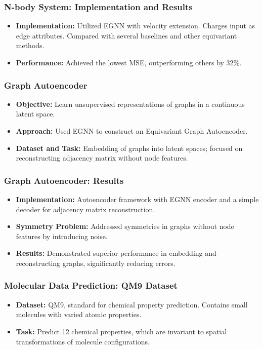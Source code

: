 \documentclass[11pt,xcolor={dvipsnames},hyperref={pdftex,pdfpagemode=UseNone,hidelinks,pdfdisplaydoctitle=true},usepdftitle=false]{beamer}
\begin{document}
\begin{frame}
\frametitle{N-body System: Implementation and Results}
\begin{itemize}
    \item \textbf{Implementation:} Utilized EGNN with velocity extension. Charges input as edge attributes. Compared with several baselines and other equivariant methods.
    \item \textbf{Performance:} Achieved the lowest MSE, outperforming others by 32\%.
\end{itemize}
\end{frame}


\begin{frame}
\frametitle{Graph Autoencoder}
\begin{itemize}
    \item \textbf{Objective:} Learn unsupervised representations of graphs in a continuous latent space.
    \item \textbf{Approach:} Used EGNN to construct an Equivariant Graph Autoencoder.
    \item \textbf{Dataset and Task:} Embedding of graphs into latent spaces; focused on reconstructing adjacency matrix without node features.
\end{itemize}
\end{frame}
    
\begin{frame}
\frametitle{Graph Autoencoder: Results}
\begin{itemize}
    \item \textbf{Implementation:} Autoencoder framework with EGNN encoder and a simple decoder for adjacency matrix reconstruction.
    \item \textbf{Symmetry Problem:} Addressed symmetries in graphs without node features by introducing noise.
    \item \textbf{Results:} Demonstrated superior performance in embedding and reconstructing graphs, significantly reducing errors.
\end{itemize}
\end{frame}


\begin{frame}
\frametitle{Molecular Data Prediction: QM9 Dataset}
\begin{itemize}
    \item \textbf{Dataset:} QM9, standard for chemical property prediction. Contains small molecules with varied atomic properties.
    \item \textbf{Task:} Predict 12 chemical properties, which are invariant to spatial transformations of molecule configurations.
\end{itemize}
\end{frame}
\end{document}

